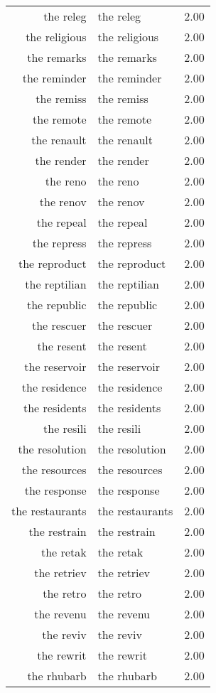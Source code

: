 \begin{table}[ht]
\begin{tabular}{rlr}
  the releg & the releg & 2.00 \\ 
  the religious & the religious & 2.00 \\ 
  the remarks & the remarks & 2.00 \\ 
  the reminder & the reminder & 2.00 \\ 
  the remiss & the remiss & 2.00 \\ 
  the remote & the remote & 2.00 \\ 
  the renault & the renault & 2.00 \\ 
  the render & the render & 2.00 \\ 
  the reno & the reno & 2.00 \\ 
  the renov & the renov & 2.00 \\ 
  the repeal & the repeal & 2.00 \\ 
  the repress & the repress & 2.00 \\ 
  the reproduct & the reproduct & 2.00 \\ 
  the reptilian & the reptilian & 2.00 \\ 
  the republic & the republic & 2.00 \\ 
  the rescuer & the rescuer & 2.00 \\ 
  the resent & the resent & 2.00 \\ 
  the reservoir & the reservoir & 2.00 \\ 
  the residence & the residence & 2.00 \\ 
  the residents & the residents & 2.00 \\ 
  the resili & the resili & 2.00 \\ 
  the resolution & the resolution & 2.00 \\ 
  the resources & the resources & 2.00 \\ 
  the response & the response & 2.00 \\ 
  the restaurants & the restaurants & 2.00 \\ 
  the restrain & the restrain & 2.00 \\ 
  the retak & the retak & 2.00 \\ 
  the retriev & the retriev & 2.00 \\ 
  the retro & the retro & 2.00 \\ 
  the revenu & the revenu & 2.00 \\ 
  the reviv & the reviv & 2.00 \\ 
  the rewrit & the rewrit & 2.00 \\ 
  the rhubarb & the rhubarb & 2.00 \\ 

\end{tabular}
\end{table}
